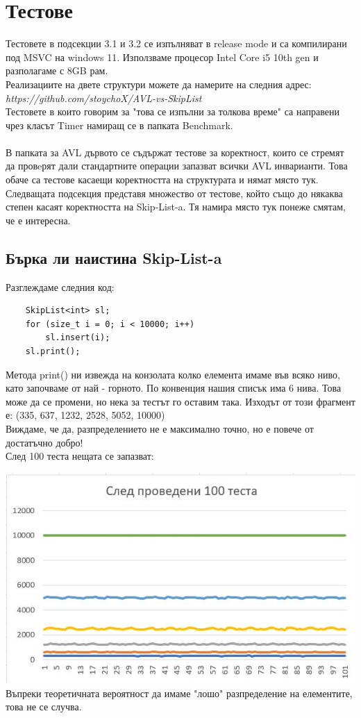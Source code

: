 \documentclass[a4paper,12pt,fleqn]{article}
\begin{document}
	\section{Тестове}
	Тестовете в подсекции 3.1 и 3.2 се изпълняват в release mode и са компилирани под MSVC на windows 11. Използваме процесор Intel Core i5 10th gen и разполагаме с 8GB рам.\\
	Реализациите на двете структури можете да намерите на следния адрес:\\
	\textit{https://github.com/stoychoX/AVL-vs-SkipList}
	\\Тестовете в които говорим за "това се изпълни за толкова време" са направени чрез класът Timer намиращ се в папката Benchmark.\\
	\\В папката за AVL дървото се съдържат тестове за коректност, които се стремят да провeрят дали стандартните операции запазват всички AVL инварианти. 
	Това обаче са тестове касаещи коректността на структурата и нямат място тук. Следващата подсекция представя множество от тестове, който също до някаква степен касаят коректността на Skip-List-a. Тя намира място тук понеже смятам, че е интересна.
	\subsection{Бърка ли наистина Skip-List-a}
	Разглеждаме следния код:
	\begin{lstlisting}
	SkipList<int> sl;
	for (size_t i = 0; i < 10000; i++)
		sl.insert(i);
	sl.print();
	\end{lstlisting}
	Метода print() ни извежда на конзолата колко елемента имаме във всяко ниво, като започваме от най - горното. По конвенция нашия списък има 6 нива. Това може да се промени, но нека за тестът го оставим така. Изходът от този фрагмент е:
	(335, 637, 1232, 2528, 5052, 10000)
	\\Виждаме, че да, разпределението не е максимално точно, но е повече от достатъчно добро!\\
	След 100 теста нещата се запазват:
	
	\includegraphics[scale=0.45]{insert-tests.jpg}\\
	Въпреки теоретичната вероятност да имаме "лошо" разпределение на елементите, това не се случва.
\end{document}
